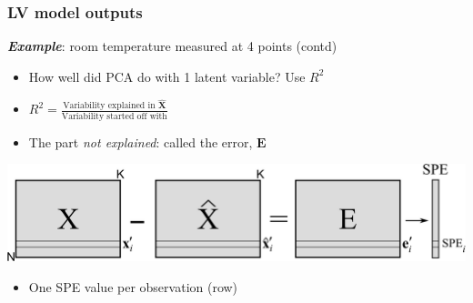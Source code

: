 \begin{frame}\frametitle{LV model outputs}

	\textbf{\emph{Example}}: room temperature measured at 4 points (contd)
	
	\begin{itemize}
		
		\item	How well did PCA do with 1 latent variable? Use \( R^2 \)
		
		\item	\vspace{6pt}\( R^2 = \frac{\displaystyle\text{Variability explained in}\,\, \hat{\mathbf{X}}}{\displaystyle \text{Variability started off with}} \) \vspace{6pt}
		
		\item	The part \emph{not explained}: called the error, \( \mathbf{E} \)
	\end{itemize}
	
	\begin{center}
		\includegraphics[width=\textwidth]{images/SPE-illustration.png}
	\end{center}

	\begin{itemize}
		\item	One SPE value per observation (row)
	\end{itemize}
	
\end{frame}

